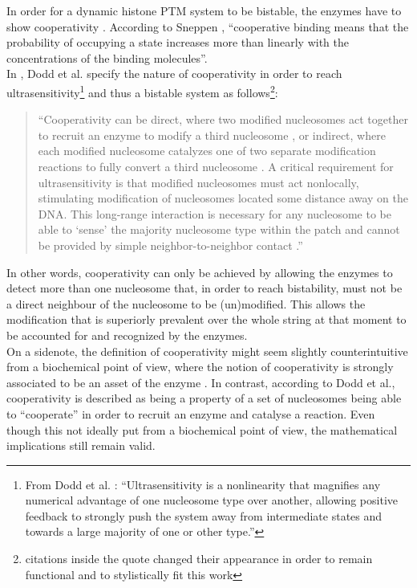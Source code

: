             In order for a dynamic histone PTM system to be bistable, the enzymes have to show cooperativity \cite{dodd2011barriers,sneppen2019theoretical,mayer2020langevin}. According to Sneppen \cite[][p.48]{sneppen2014models}, \enquote{cooperative binding means that the probability of occupying a state increases more than linearly with the concentrations of the binding molecules}.\\
            In \cite{dodd2011barriers}, Dodd et al. specify the nature of cooperativity in order to reach ultrasensitivity\footnote{From Dodd et al. \cite{dodd2011barriers}: \enquote{Ultrasensitivity is a nonlinearity that magnifies any numerical advantage of one nucleosome type over another, allowing positive feedback to strongly push the system away from intermediate states and towards a large majority of one or other type.}} and thus a bistable system as follows\footnote{citations inside the quote changed their appearance in order to remain functional and to stylistically fit this work}:
            \begin{quote}
                “Cooperativity can be direct, where two modified nucleosomes act together to recruit an enzyme to modify a third nucleosome \cite{3dodd2007theoretical,11sedighi2007epigenetic,15micheelsen2010theory}, or indirect, where each modified nucleosome catalyzes one of two separate modification reactions to fully convert a third nucleosome \cite{3dodd2007theoretical,13david2009inheritance}. A critical requirement for ultrasensitivity is that modified nucleosomes must act nonlocally, stimulating modification of nucleosomes located some distance away on the DNA. This long-range interaction is necessary for any nucleosome to be able to ‘sense’ the majority nucleosome type within the patch and cannot be provided by simple neighbor-to-neighbor contact \cite{3dodd2007theoretical,15micheelsen2010theory}.”
            \end{quote}
            In other words, cooperativity can only be achieved by allowing the enzymes to detect more than one nucleosome that, in order to reach bistability, must not be a direct neighbour of the nucleosome to be (un)modified. This allows the modification that is superiorly prevalent over the whole string at that moment to be accounted for and recognized by the enzymes.\\
            On a sidenote, the definition of cooperativity might seem slightly counterintuitive from a biochemical point of view, where the notion of cooperativity is strongly associated to be an asset of the enzyme \cite{cooperativityDefBritannica}. In contrast, according to Dodd et al., cooperativity is described as being a property of a set of nucleosomes being able to “cooperate” in order to recruit an enzyme and catalyse a reaction. Even though this not ideally put from a biochemical point of view, the mathematical implications still remain valid.\\ %
